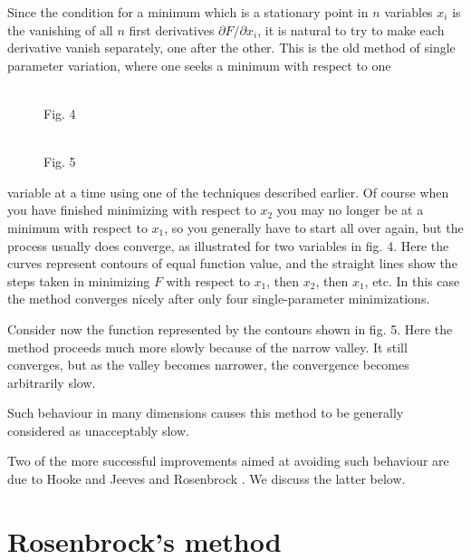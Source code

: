         Since the condition for a minimum which is a stationary point in
  $ n$ variables $x_i$ is the vanishing of all $n$ first derivatives
$\partial F/\partial x_i$, it is
   natural to try to make each derivative vanish separately, one after the
   other.  This is the old method of single
   parameter variation, where one seeks a
   minimum with respect to one\break\hfill
\begin{figure}[t]
\begin{minipage}[b]{.49\textwidth}
\begin{center}\mbox{}\\
Fig. 4
\end{center}
\end{minipage}  \hfill
\begin{minipage}[b]{.49\textwidth}
\begin{center}\mbox{}\\
Fig. 5
\end{center}
\end{minipage}
\end{figure}
\noindent
 variable at a time using one of the techniques described
 earlier.  Of course when you have finished
 minimizing with respect to $x_2$ you may no
longer be at a minimum with respect to $x_1$,
  so you generally have to start all over
 again, but the process usually does
 converge, as illustrated for two variables in
 fig. 4. Here the curves represent
contours of equal function value, and the straight lines show the steps
taken in minimizing $F$ with respect to $x_1$, then $x_2$, then $x_1$, etc.  In
this case the method converges nicely after only four single-parameter
minimizations.
 
     Consider now the function represented by the contours shown in fig. 5.
Here the method proceeds much more slowly because of the narrow valley. It still converges, but as
the valley becomes narrower, the convergence becomes arbitrarily slow.
 
Such behaviour in many dimensions causes this method to be generally
considered as unacceptably slow.
 
     Two of the more successful improvements aimed at avoiding such
behaviour are due to Hooke and Jeeves \cite{Hook} and Rosenbrock \cite{Rose}.  We discuss
the latter below.
 
 
\section{Rosenbrock's method}
 

